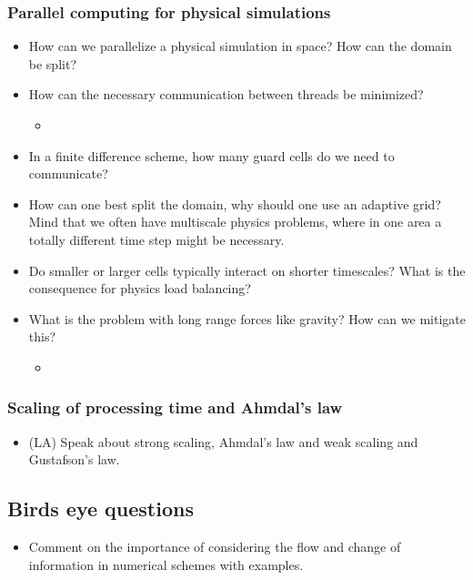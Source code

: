 \subsubsection*{Parallel computing for physical simulations}
\begin{itemize}
    \item How can we parallelize a physical simulation in space? How can the domain be split?
    \answerboxS
    \item How can the necessary communication between threads be minimized?
    \begin{itemize}
        \item {}
    \end{itemize}
    \answerboxS
    \item In a finite difference scheme, how many guard cells do we need to communicate?
    \answerboxS
    \item How can one best split the domain, why should one use an adaptive grid? Mind that we often have multiscale physics problems, where in
    one area a totally different time step might be necessary.
    \answerboxS
    \item Do smaller or larger cells typically interact on shorter timescales? What is the consequence for physics load balancing?
    \answerboxS
    \item What is the problem with long range forces like gravity? How can we mitigate this?
    \begin{itemize}
        \item {}
    \end{itemize}
    \answerboxM
\end{itemize}

\subsubsection*{Scaling of processing time and Ahmdal's law}
\begin{itemize}
    \item (LA) Speak about strong scaling, Ahmdal's law and weak scaling and Gustafson's law.
    \answerboxM
\end{itemize}

\subsection*{Birds eye questions}
\begin{itemize}
    \item Comment on the importance of considering the flow and change of information in numerical schemes with examples.
    \answerboxM
\end{itemize}

